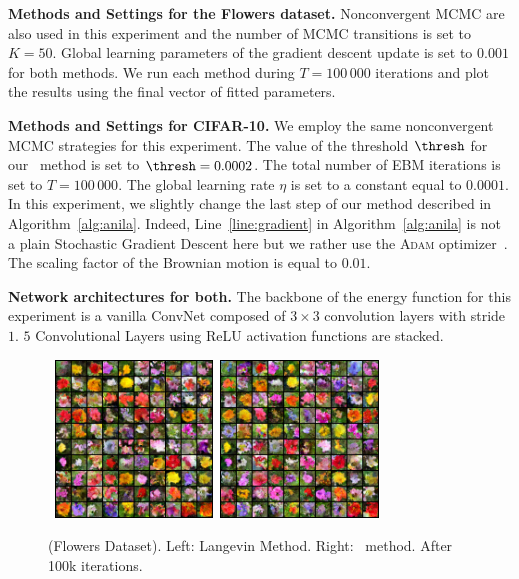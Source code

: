 \documentclass{article} %
\begin{document}
\textbf{Methods and Settings for the Flowers dataset.}
Nonconvergent MCMC are also used in this experiment and the number of MCMC transitions is set to $K = 50$.
Global learning parameters of the gradient descent update is set to $0.001$ for both methods.
We run each method during $T = 100\,000$ iterations and plot the results using the final vector of fitted parameters.

\textbf{Methods and Settings for CIFAR-10.}
We employ the same nonconvergent MCMC strategies for this experiment.
The value of the threshold $\thresh$ for our \algo\ method is set to $\thresh = 0.0002$.
The total number of EBM iterations is set to $T = 100\,000$.
The global learning rate $\eta$ is set to a constant equal to $0.0001$.
In this experiment, we slightly change the last step of our method described in Algorithm~\ref{alg:anila}.
Indeed, Line~\ref{line:gradient} in Algorithm~\ref{alg:anila} is not a plain Stochastic Gradient Descent here but we rather use the \textsc{Adam} optimizer~\cite{KB15}.
The scaling factor of the Brownian motion is equal to $0.01$.



\textbf{Network architectures for both.} 
The backbone of the energy function for this experiment is a vanilla ConvNet composed of $3 \times 3$ convolution layers with stride $1$.
$5$ Convolutional Layers using ReLU activation functions are stacked.



\begin{figure}[t]
\begin{center}
        \mbox{
        \includegraphics[width=1.65in]{figs/flowerslangevin}
        \includegraphics[width=1.65in]{figs/flowersanila}
        }
\end{center}
	\caption{(Flowers Dataset). Left: Langevin Method. Right: \algo\ method. After 100k iterations.}
	\label{fig:flowers}
\end{figure}
\end{document}
